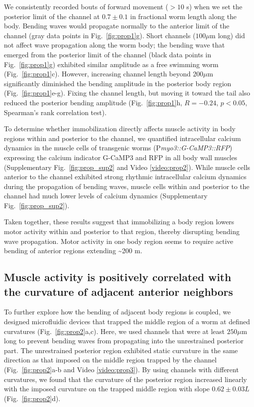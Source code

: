 We consistently recorded bouts of forward movement ($> 10$ s) when we set the posterior limit of 
the channel at $0.7 \pm 0.1$ in fractional worm length along the body. Bending waves would 
propagate normally to the anterior limit of the channel (gray data points in Fig.~\ref{fig:prop1}g). Short 
channels ($100 \mu$m long) did not affect wave propagation along the worm body; the bending wave 
that emerged from the posterior limit of the channel (black data points in Fig.~\ref{fig:prop1}g) exhibited 
similar amplitude as a free swimming worm (Fig.~\ref{fig:prop1}c). However, increasing channel length 
beyond $200 \mu$m significantly diminished the bending amplitude in the posterior body region (Fig.~\ref{fig:prop1}e-g). Fixing the channel length, but moving it toward the tail also reduced the posterior 
bending amplitude (Fig.~\ref{fig:prop1}h, $R = -0.24$, $p < 0.05$, Spearman’s rank correlation test).

To determine whether immobilization directly affects muscle activity in body regions within and 
posterior to the channel, we quantified intracellular calcium dynamics in the muscle cells of 
transgenic worms (P\textit{myo3::G-CaMP3::RFP}) expressing the calcium indicator G-CaMP3 \citep{tian_imaging_2009} and RFP in all body wall muscles (Supplementary Fig.~\ref{fig:prop_sup2} and Video \ref{video:prop2}). While 
muscle cells anterior to the channel exhibited strong rhythmic intracellular calcium dynamics 
during the propagation of bending waves, muscle cells within and posterior to the channel had 
much lower levels of calcium dynamics (Supplementary Fig.~\ref{fig:prop_sup2}).

Taken together, these results suggest that immobilizing a body region lowers motor activity 
within and posterior to that region, thereby disrupting bending wave propagation. Motor activity 
in one body region seems to require active bending of anterior regions extending \textasciitilde200 \textmu m.

\subsection{Muscle activity is positively correlated with the curvature of adjacent anterior 
neighbors}
 
To further explore how the bending of adjacent body regions is coupled, we designed 
microfluidic devices that trapped the middle region of a worm at defined curvatures (Fig.~\ref{fig:prop2}a,c). 
Here, we used channels that were at least $250 \mu$m long to prevent bending waves from 
propagating into the unrestrained posterior part. The unrestrained posterior region exhibited 
static curvature in the same direction as that imposed on the middle region trapped by the 
channel (Fig.~\ref{fig:prop2}a-b and Video  \ref{video:prop3}). By using channels with different curvatures, we 
found that the curvature of the posterior region increased linearly with the imposed curvature on 
the trapped middle region with slope $0.62 \pm 0.03 L$ (Fig.~\ref{fig:prop2}d). 



